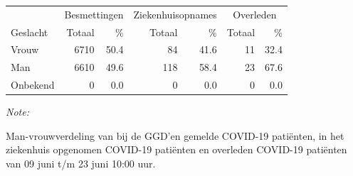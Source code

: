 \documentclass[
  english,
  man,floatsintext]{apa6}
\begin{document}
\begin{table}
\centering\begingroup\fontsize{11}{13}\selectfont

\begin{threeparttable}
\begin{tabular}{lrrrrrr}
\toprule
\multicolumn{1}{c}{ } & \multicolumn{2}{c}{Besmettingen} & \multicolumn{2}{c}{Ziekenhuisopnames} & \multicolumn{2}{c}{Overleden} \\
\cmidrule(l{3pt}r{3pt}){2-3} \cmidrule(l{3pt}r{3pt}){4-5} \cmidrule(l{3pt}r{3pt}){6-7}
Geslacht & Totaal & \% & Totaal & \% & Totaal & \%\\
\midrule
Vrouw & 6710 & 50.4 & 84 & 41.6 & 11 & 32.4\\
Man & 6610 & 49.6 & 118 & 58.4 & 23 & 67.6\\
Onbekend & 0 & 0.0 & 0 & 0.0 & 0 & 0.0\\
\bottomrule
\end{tabular}
\begin{tablenotes}
\item \textit{Note: } 
\item Man-vrouwverdeling van bij de GGD’en gemelde COVID-19 patiënten, in het ziekenhuis opgenomen COVID-19 patiënten en overleden COVID-19 patiënten van 09 juni t/m 23 juni 10:00 uur.
\end{tablenotes}
\end{threeparttable}
\endgroup{}
\end{table}
\newpage
\end{document}

